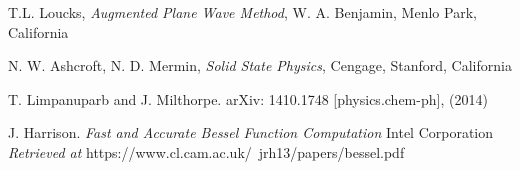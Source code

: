 \documentclass[11pt]{article}
\numberwithin{equation}{section}
\begin{document}
\begin{thebibliography}{99}

  T.L. Loucks, \textit{Augmented Plane Wave Method}, W. A. Benjamin, Menlo Park, California
  
  N. W. Ashcroft, N. D. Mermin, \textit{Solid State Physics}, Cengage, Stanford, California
  
  T. Limpanuparb and J. Milthorpe. arXiv: 1410.1748 [physics.chem-ph], (2014)
  
  J. Harrison. \textit{Fast and Accurate Bessel Function Computation} Intel Corporation \\
  \textit{Retrieved at } https://www.cl.cam.ac.uk/~jrh13/papers/bessel.pdf
  

\end{thebibliography}
\end{document}
